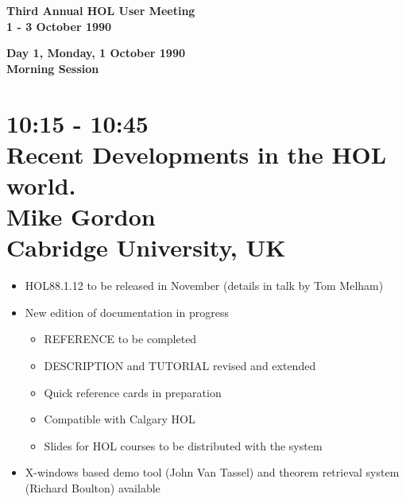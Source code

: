 \setlength{\textwidth}{6.4in}
\setlength{\oddsidemargin}{0in}
\setlength{\topmargin}{-0.2in}
\setlength{\textheight}{9.25in}



\def\thebibliography#1{\subsection*{References}\list
 {[\arabic{enumi}]}{\settowidth\labelwidth{[#1]}\leftmargin\labelwidth
 \advance\leftmargin\labelsep
 \usecounter{enumi}}
 \def\newblock{\hskip .11em plus .33em minus .07em}
 \sloppy\clubpenalty4000\widowpenalty4000
 \sfcode`\.=1000\relax}
\let\endthebibliography=\endlist



\sloppy
\begin{center}\LARGE\bf
Third Annual HOL User Meeting\\
1 - 3 October 1990
\end{center}

\begin{center}\Large\bf
Day 1, Monday, 1 October 1990\\
Morning Session
\end{center}

\section*{10:15 - 10:45\\
Recent Developments in the HOL world.\\
Mike Gordon\\
\large\bf Cabridge University, UK}

\begin{itemize}
\item {\small HOL88.1.12} to be released in November
(details in talk by Tom Melham)
\item New edition of documentation in progress
\begin{itemize}
\item {\small REFERENCE} to be completed
\item {\small DESCRIPTION} and {\small TUTORIAL} revised and extended
\item Quick reference cards in preparation
\item Compatible with Calgary {\small HOL}
\item Slides
for {\small HOL} courses to be distributed with the system
\end{itemize}
\item X-windows based demo tool (John Van Tassel) and
theorem retrieval system (Richard Boulton) available
\end{itemize}

